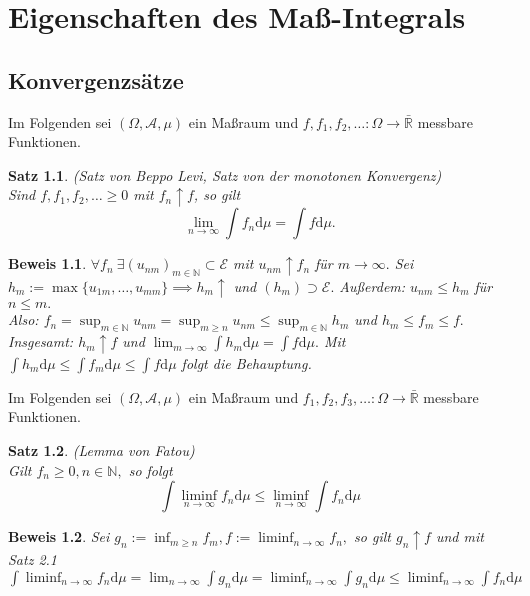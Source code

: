 \documentclass[a4paper,11pt]{book}
\newcommand{\R}{{\mathbb R}}
\newcommand{\N}{{\mathbb N}}
\def\AA{ \mathcal{A} }
\def\EE{ \mathcal{E} }
\def\folgt{\ensuremath{\implies}}
\def\d{\mbox{d}}
\newtheorem{Sa}{Satz}[chapter]
\theoremstyle{nonumberplain}
\newtheorem{Bew}{Beweis}
\begin{document}
\chapter{Eigenschaften des Maß-Integrals}
\section{Konvergenzsätze}
Im Folgenden sei $(\Omega, \AA, \mu)$ ein Maßraum und $f, f_1, f_2, \ldots:\Omega\to\bar\R$ messbare Funktionen.
\begin{Sa} (Satz von Beppo Levi, Satz von der monotonen Konvergenz)\\
Sind $f, f_1, f_2,\ldots\ge 0$ mit $f_n\uparrow f$, so gilt 
$$\lim_{n\to\infty}\int f_n\d\mu=\int f\d\mu.$$
\end{Sa}
\begin{Bew} $\forall f_n\ \exists(u_{nm})_{m\in\N}\subset\EE$ mit $u_{nm}\uparrow f_n$ für $m\to\infty.$ Sei $h_m:=\max\{u_{1m},\ldots,u_{mm}\}\folgt h_m\uparrow$ und $(h_m)\supset\EE.$ Außerdem: $u_{nm}\le h_m$ für $n\le m.$\\
Also: $f_n=\sup_{m\in\N}u_{nm}=\sup_{m\ge n}u_{nm}\le\sup_{m\in\N}h_m$ und $h_m\le f_m\le f.$ Insgesamt: $h_m\uparrow f$ und $\lim_{m\to\infty}\int h_m\d\mu=\int f\d\mu.$ Mit $\int h_m\d\mu\le\int f_m\d\mu\le\int f\d\mu$ folgt die Behauptung.
\end{Bew}

Im Folgenden sei $(\Omega, \AA, \mu)$ ein Maßraum und $f_1, f_2, f_3, \ldots:\Omega\to\bar\R$ messbare Funktionen.

\begin{Sa} (Lemma von Fatou)\\
Gilt $f_n\ge 0, n\in\N,$ so folgt
$$\int\liminf_{n\to\infty} f_n\d\mu \le \liminf_{n\to\infty}\int f_n\d\mu$$
\end{Sa}
\begin{Bew} Sei $g_n:=\inf_{m\ge n} f_m, f:=\liminf_{n\to\infty} f_n,$ so gilt $g_n\uparrow f$ und mit Satz 2.1 $\int\liminf_{n\to\infty} f_n\d\mu=\lim_{n\to\infty}\int g_n\d\mu = \liminf_{n\to\infty}\int g_n\d\mu\le \liminf_{n\to\infty}\int f_n\d\mu$
\end{Bew}
\end{document}

